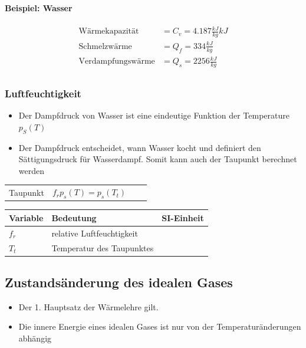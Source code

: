 \documentclass[
a4paper,
oneside,
landscape, 
8pt,
]{scrartcl}
\begin{document}
\begin{multicols*}{2}
\begin{minipage}[h!]{0.5\linewidth}
\paragraph{Beispiel: Wasser}
\begin{align*}
\text{Wärmekapazität} &= C_v=4.187 \frac{kJ}{kg}kJ \\
\text{Schmelzwärme} &= Q_f = 334\frac{kJ}{kg} \\
\text{Verdampfungswärme} &= Q_s=2256\frac{kJ}{kg} \\
\end{align*}
\end{minipage}

\subsubsection{Luftfeuchtigkeit}
\begin{itemize}
	\item Der Dampfdruck von Wasser ist eine eindeutige Funktion der Temperature $p_S (T)$
	\item Der Dampfdruck entscheidet, wann Wasser kocht und definiert den Sättigungsdruck für Wasserdampf. Somit kann auch der Taupunkt berechnet werden
\end{itemize}

\begin{tabbing}
	\begin{tabu} to \linewidth {l X l X}
		\toprule
		Taupunkt & $f_r  p_s (T) = p_s (T_t)$  &
		&  \\
	\end{tabu}
\end{tabbing}

\begin{tabbing}
	\begin{tabu} to \linewidth {l X l}
		Variable & Bedeutung & SI-Einheit \\
		\midrule
		$f_r$ & relative Luftfeuchtigkeit &  \\
		$T_t$ & Temperatur des Taupunktes &  \\
		\bottomrule
	\end{tabu}
\end{tabbing}

\clearpage

\subsection{Zustandsänderung des idealen Gases}
\begin{itemize}
	\item Der 1. Hauptsatz der Wärmelehre gilt.
	\item Die innere Energie eines idealen Gases ist nur von der Temperaturänderungen abhängig
\end{itemize}


\end{multicols*}
\end{document}

